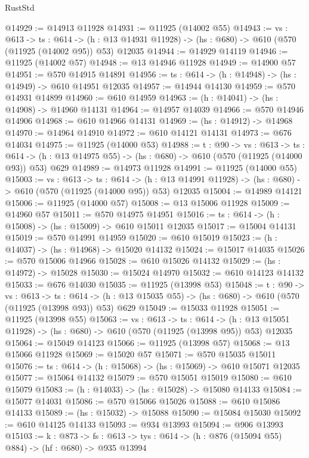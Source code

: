 \begin{lexlean}{RustStd}
\begin{coremodule}
@14929 := @14913 @11928
@14931 := @11925 (@14002 @55)
@14943 := {vs : @613} ->
  {ts : @614} ->
  (h : @13 @14931 @11928) -> (hs : @680) -> @610 (@570 (@11925 (@14002 @95)) @53) @12035
@14944 := @14929 @14119
@14946 := @11925 (@14002 @57)
@14948 := @13 @14946 @11928
@14949 := @14900 @57
@14951 := @570 @14915 @14891
@14956 := {ts : @614} -> (h : @14948) -> (hs : @14949) -> @610 @14951 @12035
@14957 := @14944 @14130
@14959 := @570 @14931 @14899
@14960 := @610 @14959
@14963 := (h : @14041) -> (hs : @14908) -> @14960 @14131
@14964 := @14957 @14039
@14966 := @570 @14946 @14906
@14968 := @610 @14966 @14131
@14969 := (hs : @14912) -> @14968
@14970 := @14964 @14910
@14972 := @610 @14121 @14131
@14973 := @676 @14034
@14975 := @11925 (@14000 @53)
@14988 := {t : @90} ->
  {vs : @613} ->
  {ts : @614} -> (h : @13 @14975 @55) -> (hs : @680) -> @610 (@570 (@11925 (@14000 @93)) @53) @629
@14989 := @14973 @11928
@14991 := @11925 (@14000 @55)
@15003 := {vs : @613} ->
  {ts : @614} ->
  (h : @13 @14991 @11928) -> (hs : @680) -> @610 (@570 (@11925 (@14000 @95)) @53) @12035
@15004 := @14989 @14121
@15006 := @11925 (@14000 @57)
@15008 := @13 @15006 @11928
@15009 := @14960 @57
@15011 := @570 @14975 @14951
@15016 := {ts : @614} -> (h : @15008) -> (hs : @15009) -> @610 @15011 @12035
@15017 := @15004 @14131
@15019 := @570 @14991 @14959
@15020 := @610 @15019
@15023 := (h : @14037) -> (hs : @14968) -> @15020 @14132
@15024 := @15017 @14035
@15026 := @570 @15006 @14966
@15028 := @610 @15026 @14132
@15029 := (hs : @14972) -> @15028
@15030 := @15024 @14970
@15032 := @610 @14123 @14132
@15033 := @676 @14030
@15035 := @11925 (@13998 @53)
@15048 := {t : @90} ->
  {vs : @613} ->
  {ts : @614} -> (h : @13 @15035 @55) -> (hs : @680) -> @610 (@570 (@11925 (@13998 @93)) @53) @629
@15049 := @15033 @11928
@15051 := @11925 (@13998 @55)
@15063 := {vs : @613} ->
  {ts : @614} ->
  (h : @13 @15051 @11928) -> (hs : @680) -> @610 (@570 (@11925 (@13998 @95)) @53) @12035
@15064 := @15049 @14123
@15066 := @11925 (@13998 @57)
@15068 := @13 @15066 @11928
@15069 := @15020 @57
@15071 := @570 @15035 @15011
@15076 := {ts : @614} -> (h : @15068) -> (hs : @15069) -> @610 @15071 @12035
@15077 := @15064 @14132
@15079 := @570 @15051 @15019
@15080 := @610 @15079
@15083 := (h : @14033) -> (hs : @15028) -> @15080 @14133
@15084 := @15077 @14031
@15086 := @570 @15066 @15026
@15088 := @610 @15086 @14133
@15089 := (hs : @15032) -> @15088
@15090 := @15084 @15030
@15092 := @610 @14125 @14133
@15093 := @934 @13993
@15094 := @906 @13993
@15103 := {k : @873} ->
  {fs : @613} -> {tys : @614} -> (h : @876 (@15094 @55) @884) -> (hf : @680) -> @935 @13994

\end{coremodule}
\end{lexlean}
